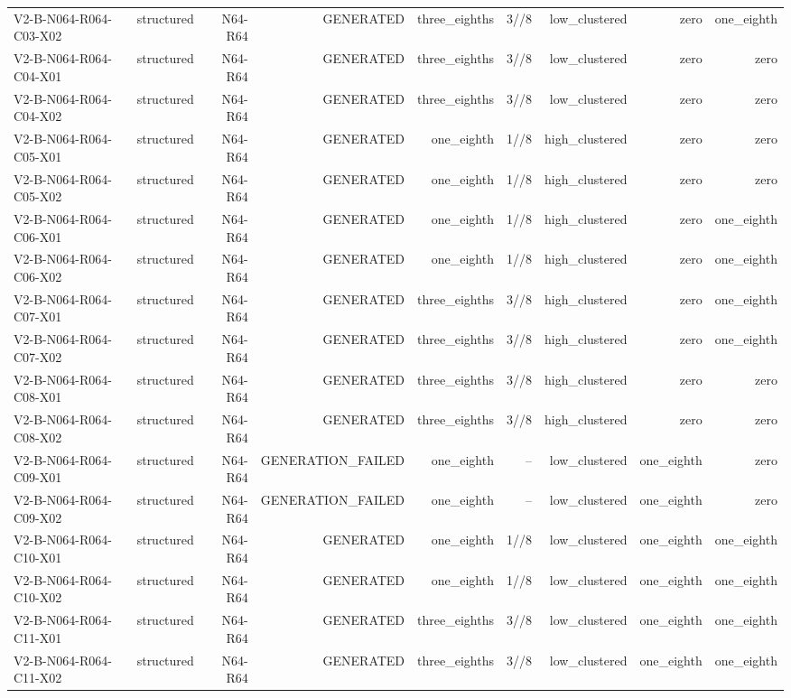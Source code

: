 {\begin{longtable}{lrrrrrrrr}
V2-B-N064-R064-C03-X02 & structured & N64-R64 & GENERATED & three\_eighths & 3//8 & low\_clustered & zero & one\_eighth \\
V2-B-N064-R064-C04-X01 & structured & N64-R64 & GENERATED & three\_eighths & 3//8 & low\_clustered & zero & zero \\
V2-B-N064-R064-C04-X02 & structured & N64-R64 & GENERATED & three\_eighths & 3//8 & low\_clustered & zero & zero \\
V2-B-N064-R064-C05-X01 & structured & N64-R64 & GENERATED & one\_eighth & 1//8 & high\_clustered & zero & zero \\
V2-B-N064-R064-C05-X02 & structured & N64-R64 & GENERATED & one\_eighth & 1//8 & high\_clustered & zero & zero \\
V2-B-N064-R064-C06-X01 & structured & N64-R64 & GENERATED & one\_eighth & 1//8 & high\_clustered & zero & one\_eighth \\
V2-B-N064-R064-C06-X02 & structured & N64-R64 & GENERATED & one\_eighth & 1//8 & high\_clustered & zero & one\_eighth \\
V2-B-N064-R064-C07-X01 & structured & N64-R64 & GENERATED & three\_eighths & 3//8 & high\_clustered & zero & one\_eighth \\
V2-B-N064-R064-C07-X02 & structured & N64-R64 & GENERATED & three\_eighths & 3//8 & high\_clustered & zero & one\_eighth \\
V2-B-N064-R064-C08-X01 & structured & N64-R64 & GENERATED & three\_eighths & 3//8 & high\_clustered & zero & zero \\
V2-B-N064-R064-C08-X02 & structured & N64-R64 & GENERATED & three\_eighths & 3//8 & high\_clustered & zero & zero \\
V2-B-N064-R064-C09-X01 & structured & N64-R64 & GENERATION\_FAILED & one\_eighth & -- & low\_clustered & one\_eighth & zero \\
V2-B-N064-R064-C09-X02 & structured & N64-R64 & GENERATION\_FAILED & one\_eighth & -- & low\_clustered & one\_eighth & zero \\
V2-B-N064-R064-C10-X01 & structured & N64-R64 & GENERATED & one\_eighth & 1//8 & low\_clustered & one\_eighth & one\_eighth \\
V2-B-N064-R064-C10-X02 & structured & N64-R64 & GENERATED & one\_eighth & 1//8 & low\_clustered & one\_eighth & one\_eighth \\
V2-B-N064-R064-C11-X01 & structured & N64-R64 & GENERATED & three\_eighths & 3//8 & low\_clustered & one\_eighth & one\_eighth \\
V2-B-N064-R064-C11-X02 & structured & N64-R64 & GENERATED & three\_eighths & 3//8 & low\_clustered & one\_eighth & one\_eighth \\

\end{longtable}}
